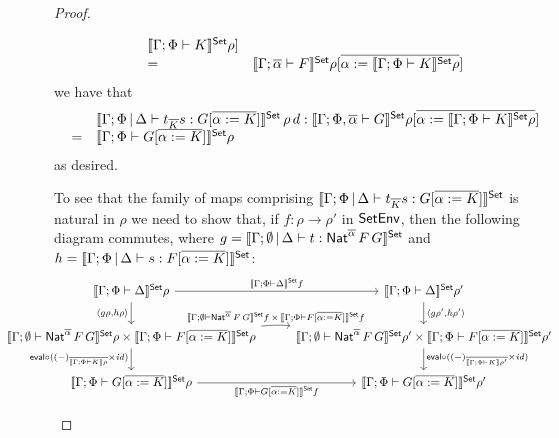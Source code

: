 \documentclass[runningheads]{llncs}
\renewcommand{\id}{\mathit{id}}
\renewcommand{\id}{\mathit{id}}
\begin{document}
\begin{proof}
\begin{itemize}
\[\begin{array}{ll}
{    \llbracket{\Gamma;\Phi \vdash K}\rrbracket^{\mathsf{Set}}\rho}] \\
    =& \llbracket{\Gamma;
  \overline{\alpha} \vdash F}\rrbracket^{\mathsf{Set}}\rho[\overline{\alpha := \llbracket{\Gamma;\Phi \vdash
      K}\rrbracket^{\mathsf{Set}}\rho}] 
\end{array}\]
      we have that 
\[\begin{array}{ll}
  &\llbracket{\Gamma;\Phi \,|\, \Delta
  \vdash t_{\overline K} s: G [\overline{\alpha :=
      K}]}\rrbracket^{\mathsf{Set}}\,\rho\,d : \llbracket{\Gamma; \Phi ,\overline{\alpha} \vdash
  G}\rrbracket^{\mathsf{Set}}\rho[\overline{\alpha := \llbracket{\Gamma;\Phi \vdash K}\rrbracket^{\mathsf{Set}}\rho}]  \\
  =&\llbracket{\Gamma; \Phi \vdash G[\overline{\alpha := K}]}\rrbracket^{\mathsf{Set}}\rho
\end{array}\]
as desired.

\vspace*{0.1in}

To see that the family of maps comprising $\llbracket{\Gamma;\Phi \,|\,
  \Delta \vdash t_{\overline K} s: G [\overline{\alpha := K}]}\rrbracket^{\mathsf{Set}}$
is natural in $\rho$
we need to show that, if $f : \rho \to \rho'$ in $\mathsf{SetEnv}$, then the
following diagram commutes, where $g = \llbracket{\Gamma; \emptyset \,|\,
  \Delta \vdash t : \mathsf{Nat}^{\overline{\alpha}} \,F \,G}\rrbracket^{\mathsf{Set}}$ and $h =
\llbracket{\Gamma;\Phi \,|\, \Delta \vdash s: F [\overline{\alpha :=
      K}]}\rrbracket^{\mathsf{Set}}$:
{\footnotesize
\[\hspace*{-0.6in}
\begin{tikzcd}
\setsem{\Gamma;\Phi \vdash \Delta}\rho \ar[r, "{\setsem{\Gamma;\Phi
  \vdash \Delta}f}"] \ar[d, "{\langle g \rho, h \rho\rangle}"']
& \setsem{\Gamma;\Phi \vdash 
  \Delta}\rho' \ar[d, "{\langle g \rho', h \rho' \rangle}"]\\
\setsem{\Gamma;\emptyset \vdash \Nat^{\overline{\alpha}} \,F \,G}\rho
\times \setsem{\Gamma;\Phi \vdash F [\overline{\alpha := K}]}\rho
\ar[d, "{\eval \circ ((-)_{\overline{\sem{\Gamma;\Phi \vdash K}\rho}} \times
    \id)}"']
\ar[r, bend left = 5, "{\setsem{\Gamma;\emptyset\vdash
      \Nat^{\overline{\alpha}} \,F \,G}f\, \times\, \setsem{\Gamma;\Phi
      \vdash F [\overline{\alpha := K}]}f}"] &
\setsem{\Gamma;\emptyset \vdash \Nat^{\overline{\alpha}} \,F \,G}\rho'
\times \setsem{\Gamma;\Phi \vdash F [\overline{\alpha := K}]}\rho'
\ar[d, "{\eval \circ ((-)_{\overline{\sem{\Gamma;\Phi \vdash
          K}\rho'}} \times \id)}"] \\
\setsem{\Gamma;\Phi \vdash G [\overline{\alpha := K}]}\rho
\ar[r, "{\setsem{\Gamma;\Phi \vdash G [\overline{\alpha := K}]}f}"']
&
\setsem{\Gamma;\Phi \vdash G [\overline{\alpha := K}]}\rho'
\end{tikzcd}\]}


\end{itemize}
\end{proof}
\end{document}
